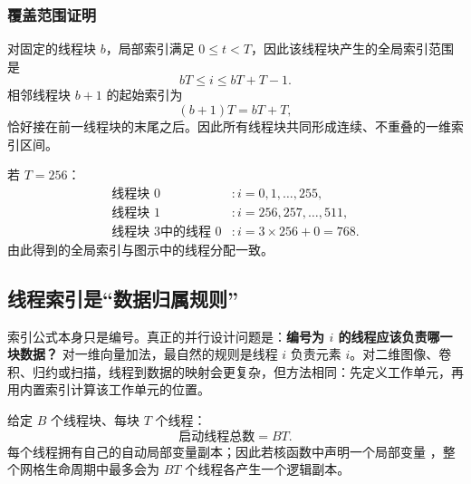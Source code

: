 \subsubsection{覆盖范围证明}

对固定的线程块 $b$，局部索引满足 $0\le t<T$，因此该线程块产生的全局索引范围是
\[
bT\le i\le bT+T-1.
\]
相邻线程块 $b+1$ 的起始索引为
\[
(b+1)T=bT+T,
\]
恰好接在前一线程块的末尾之后。因此所有线程块共同形成连续、不重叠的一维索引区间。

\begin{examplebox}[title={例：线程块大小为 256}]
若 $T=256$：
\begin{align*}
\text{线程块 }0 &: i=0,1,\ldots,255,\\
\text{线程块 }1 &: i=256,257,\ldots,511,\\
\text{线程块 }3\text{中的线程 }0 &: i=3\times256+0=768.
\end{align*}
由此得到的全局索引与图示中的线程分配一致。
\end{examplebox}

\subsection{线程索引是“数据归属规则”}

索引公式本身只是编号。真正的并行设计问题是：\textbf{编号为 $i$ 的线程应该负责哪一块数据？} 对一维向量加法，最自然的规则是线程 $i$ 负责元素 $i$。对二维图像、卷积、归约或扫描，线程到数据的映射会更复杂，但方法相同：先定义工作单元，再用内置索引计算该工作单元的位置。

\begin{keybox}[title={关键结论}]
给定 $B$ 个线程块、每块 $T$ 个线程：
\[
\text{启动线程总数}=BT.
\]
每个线程拥有自己的自动局部变量副本；因此若核函数中声明一个局部变量 ，整个网格生命周期中最多会为 $BT$ 个线程各产生一个逻辑副本。
\end{keybox}
